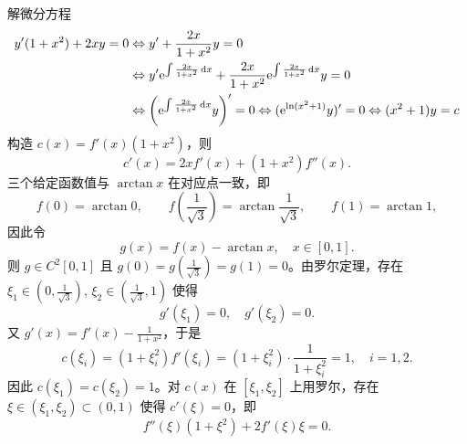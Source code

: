 \begin{solution}
解微分方程
\begin{align*}
    y'(1+x^2)+2xy=0&\Leftrightarrow y'+\frac{2x}{1+x^2}y=0\\
    &\Leftrightarrow y'\mathrm{e}^{\int\frac{2x}{1+x^2}\mathop{}\!\mathrm{d} x}+\frac{2x}{1+x^2}\mathrm{e}^{\int\frac{2x}{1+x^2}\mathop{}\!\mathrm{d} x}y=0\\
    &\Leftrightarrow\left(\mathrm{e}^{\int\frac{2x}{1+x^2}\mathop{}\!\mathrm{d} x}y\right)'=0\Leftrightarrow(\mathrm{e}^{\ln(x^2+1)}y)' =0\Leftrightarrow(x^2+1)y=c
\end{align*}
构造 $c(x)=f'(x)(1+x^2)$，则
\[
c'(x)=2xf'(x)+(1+x^2)f''(x).
\]
三个给定函数值与 $\arctan x$ 在对应点一致，即
\[
f(0)=\arctan 0,\qquad f\!\left(\frac{1}{\sqrt{3}}\right)=\arctan\frac{1}{\sqrt{3}},\qquad f(1)=\arctan 1,
\]
因此令
\[
g(x)=f(x)-\arctan x,\quad x\in[0,1].
\]
则 $g\in C^2[0,1]$ 且 $g(0)=g\!\left(\frac{1}{\sqrt{3}}\right)=g(1)=0$。由罗尔定理，存在 $\xi_1\in\left(0,\frac{1}{\sqrt{3}}\right)$, $\xi_2\in\left(\frac{1}{\sqrt{3}},1\right)$ 使得
\[
g'(\xi_1)=0,\quad g'(\xi_2)=0.
\]
又 $g'(x)=f'(x)-\frac{1}{1+x^2}$，于是
\[
c(\xi_i)=(1+\xi_i^2)f'(\xi_i)=(1+\xi_i^2)\cdot\frac{1}{1+\xi_i^2}=1,\quad i=1,2.
\]
因此 $c(\xi_1)=c(\xi_2)=1$。对 $c(x)$ 在 $[\xi_1,\xi_2]$ 上用罗尔，存在 $\xi\in(\xi_1,\xi_2)\subset(0,1)$ 使得 $c'(\xi)=0$，即
\[
f''(\xi)(1+\xi^2)+2f'(\xi)\xi=0.
\]
\end{solution}

\newpage
